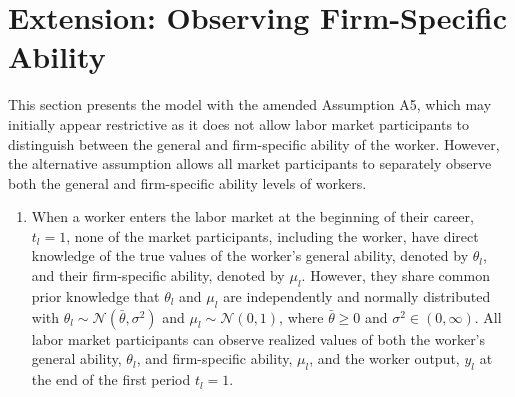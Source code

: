 \documentclass[12pt]{article}
\newtheorem{corollary}[theorem]{Corollary}
\begin{document}



\section{Extension: Observing Firm-Specific Ability}
This section presents the model with the amended Assumption A5, which may initially appear restrictive as it does not allow labor market participants to distinguish between the general and firm-specific ability of the worker. However, the alternative assumption allows all market participants to separately observe both the general and firm-specific ability levels of workers.

\begin{enumerate}[label={A5.}{\arabic*}.]
    \item When a worker enters the labor market at the beginning of their career, $t_l =1$, none of the market participants, including the worker, have direct knowledge of the true values of the worker's general ability, denoted by $\theta_l$, and their firm-specific ability, denoted by $\mu_l$. However, they share common prior knowledge that $\theta_l$ and $\mu_l$ are independently and normally distributed with $\theta_l \sim \mathcal{N}\left( \bar{\theta}, \sigma^2\right)$ and $\mu_l \sim \mathcal{N}\left( 0, 1\right)$, where $\bar{\theta} \geq 0$ and $\sigma^2 \in (0, \infty)$. All labor market participants can observe realized values of both the worker's general ability, $\theta_l$, and firm-specific ability, $\mu_l$, and the worker output, $y_l$ at the end of the first period $t_l = 1$.
\end{enumerate}
\end{document}
